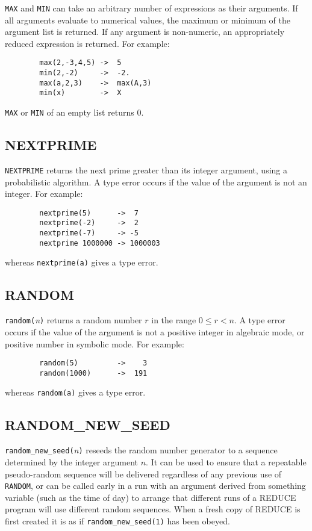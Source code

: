 \texttt{MAX} and \texttt{MIN} can take an arbitrary
number of expressions as their arguments.  If all arguments evaluate to
numerical values, the maximum or minimum of the argument list is returned.
If any argument is non-numeric, an appropriately reduced expression is
returned.  For example:
\begin{verbatim}
        max(2,-3,4,5) ->  5
        min(2,-2)     ->  -2.
        max(a,2,3)    ->  max(A,3)
        min(x)        ->  X
\end{verbatim}
\texttt{MAX} or \texttt{MIN} of an empty list returns 0.

\subsection{NEXTPRIME}
\hypertarget{operator:NEXTPRIME}{}

\texttt{NEXTPRIME} returns the next prime greater than its integer argument,
using a probabilistic algorithm.  A type error occurs if the value of the
argument is not an integer.  For example:
\begin{verbatim}
        nextprime(5)      ->  7
        nextprime(-2)     ->  2
        nextprime(-7)     -> -5
        nextprime 1000000 -> 1000003
\end{verbatim}
whereas \texttt{nextprime(a)} gives a type error.

\subsection{RANDOM}
\hypertarget{operator:RANDOM}{}

\texttt{random(}{\em n\/}\texttt{)} returns a random number $r$ in the
range $0\leq r < n$.  A type error occurs if the value of the argument is not a
positive integer in algebraic mode, or positive number in symbolic mode.
For example:
\begin{verbatim}
        random(5)         ->    3
        random(1000)      ->  191
\end{verbatim}
whereas \texttt{random(a)} gives a type error.

\subsection{RANDOM\_NEW\_SEED}
\hypertarget{operator:RANDOM_NEW_SEED}{}

\texttt{random\_new\_seed(}\emph{n}\texttt{)} reseeds the random number
generator
to a sequence determined by the integer argument $n$.  It can be used to
ensure that a repeatable pseudo-random sequence will be delivered
regardless of any previous use of \texttt{RANDOM}, or can be called early in
a run with an argument derived from something variable (such as the time
of day) to arrange that different runs of a REDUCE program will use
different random sequences.  When a fresh copy of REDUCE is first created
it is as if \texttt{random\_new\_seed(1)} has been obeyed.

